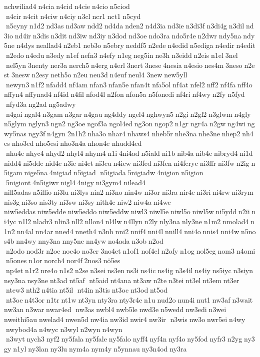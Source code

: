 nchwiliad4 n4cia n4cid n4cie n4cio n5ciod  n4cir n4cit n4ciw n4ciy n3cl ncr1 nct1 n5cyd  n5cyny n1d2 nd3as nd3aw ndd2 nd4da nden2 n4d3ia nd3ie n3di3f n3di4g n3dil nd3io nd4ir n3dis n3dit nd3iw nd3iy n3dod nd3oe ndo3ra ndo5r4e n2dwr ndy5na ndy5ne n4dys neallad4 n2eb1 neb3o n5ebry neddf5 n2ede n4edid n5ediga n4edir n4edit n2edo n4edu n3edy n1ef nefn3 n4efy n1eg neg5in ne3h n3eidd n2eis n1el 3nel  nel5yn 3nenty ner3a nerch5 n4erg n4erl 3nert 3nese 4nesia n4esio nes4m 3neso n2est 3nesw n2esy neth5o n2eu neu3d n4euf neul4 3new new5yll  newyn3 n1f2 nfadd4 nf4am nfan3 nfan5e nfan4t nfa5ol nf4at nfel2 nff2 nf4fa nff4o nffyn4 nffynad4 nf4id n4fil nfod4l n2fon nfon5a n5fonedi nf4ri nf4wy n2fy n5fyd  nfyd3a ng2ad ng5adwy  n4gai ngal4 n3gam n3gar n4gau ng4ddy ngel4 nghwyn5 n2gi n2gl2 n3glwm n4gly n5glym nglyn3 ngn2 ng3oe ngof3a ngol4ed ng3on ngop2 n1gr ngr4a n2gw ng4wi ngwy5nas ngy3f n4gyn 2n1h2 nha3o nhar4 nhaws4 nheb5r nhe3na nhe3ne nhep2 nh4es nho3ed nho5esi nho3n4a nhon4e 	nhudd4ed  nhu4e nhyc4 nhyd2 nhyl4 nhym4 n1i 4ni4ad n5iald ni1b nib4a nib4e nibryd4 ni1d nidd4 ni5dde nid4e n3ie ni4et ni3eu n4iew ni3fed ni3fen ni4feryc ni3ffr ni3fw n2ig n5igam nige5na 4nigiad n5igiad  n5igiada 5nigiadw 4nigion n5igion  5nigiont 4n5igiwr nigl4 4nigy ni3gym4 nilead4 	nill5adas n5illio ni3lu ni3lys nin2 ni3no nin4w ni3or ni3ra nir4e ni3ri ni4rw ni3rym nis3g ni3so nis3ty ni3sw ni3sy nith4e niw2 niw4a ni4wc 	niw5eddas niw5edde niw5eddo niw5eddw niwl3 niwl5e niwl5o niwl5w ni5ydd n2ïi nï4yc n1l2 nladr3 nlin3 nll2 nllon4 nl4lw n4llyn n2ly nly3na nly3ne n1m2 nmolad4 n1n2 nn4al nn4ar nned4 nneth4 n3nh nni2 nnif4 nni4l nnill4 nni4o nnis4 nni4w n5nos4b nn4wy nny3na nny5ne nn4yw no4ada n3ob n2od  n2odo nod3r n2oe noe4o no3er 3no4et n1of1 nof4el n2ofy n1og nol5eg nom3 n4omi n5ones n1or norch4 nor4f 2nos3 nö5es  np4et n1r2 nre4o n1s2 n2se n3sei ns3en ns3i ns4ic ns4ig n3s4il ns4iy ns5iyc n3siyn nsy3na nsy3ne nt3ad nt5af  nt5aid nt4ana nt3aw n2te n3tei nt3el nt3em nt3er  ntew3 nth2 n4tia nt5il  nt4in n3tis nt3oc nt3od nt5od  nt3oe n4t3or n1tr nt1w nt3yn nty3ra nty3r4e n1u nud2o nun4i nut1 nw3af n3wait nw3an n3war nwar4ed  nw3as nwbl4 nwb5le nwd3e n5wedd nw3edi n3wei 
nweithi5au nwelad4 nwen5d nw4ia nw3id nwir4 nw3ir  n3wis nw3o nwr5ei n4wy  nwybod4a n4wyc n3wyl n2wyn n4wyn  n3wyt nych3 nyf2 ny5fala ny5fale ny5falo nyff4 nyf4n nyf4o ny5fod nyfr3 n2yg ny3gy n1yl ny3lan ny3lu nym4a nym4y n5ynnau ny3n4od ny3ra 
